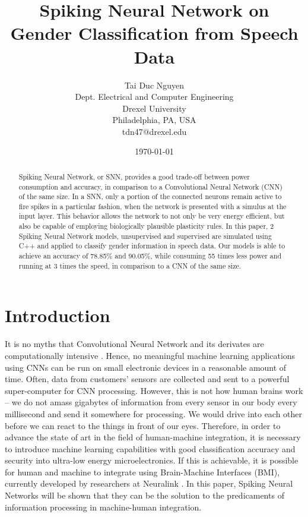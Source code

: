 \documentclass[11pt]{article}  %
\title{Spiking Neural Network on \\ Gender Classification from Speech Data}
\author{
	Tai Duc Nguyen \\
	Dept. Electrical and Computer Engineering \\
	Drexel University \\
	Philadelphia, PA, USA \\
	tdn47@drexel.edu
}
\date{\today}
\begin{document}
\maketitle

\begin{abstract}
	Spiking Neural Network, or SNN, provides a good trade-off between power consumption and accuracy, in comparison to a Convolutional Neural Network (CNN) of the same size. In a SNN, only a portion of the connected neurons remain active to fire spikes in a particular fashion, when the network is presented with a simulus at the input layer. This behavior allows the network to not only be very energy efficient, but also be capable of employing biologically plausible plasticity rules. In this paper, 2 Spiking Neural Network models, unsupervised and supervised are simulated using C++ and applied to classify gender information in speech data. Our models is able to achieve an accuracy of 78.85\% and 90.05\%, while consuming 55 times less power and running at 3 times the speed, in comparison to a CNN of the same size.
\end{abstract}

\section{Introduction}
\label{intro}

It is no myths that Convolutional Neural Network and its derivates are computationally intensive \cite{b1}. Hence, no meaningful machine learning applications using CNNs can be run on small electronic devices in a reasonable amount of time. Often, data from customers' sensors are collected and sent to a powerful super-computer for CNN processing. However, this is not how human brains work -- we do not amass gigabytes of information from every sensor in our body every millisecond and send it somewhere for processing. We would drive into each other before we can react to the things in front of our eyes. Therefore, in order to advance the state of art in the field of human-machine integration, it is necessary to introduce machine learning capabilities with good classification accuracy and security into ultra-low energy microelectronics. If this is achievable, it is possible for human and machine to integrate using Brain-Machine Interfaces (BMI), currently developed by researchers at Neuralink \cite{b2}. In this paper, Spiking Neural Networks will be shown that they can be the solution to the predicaments of information processing in machine-human integration. 
\end{document}
